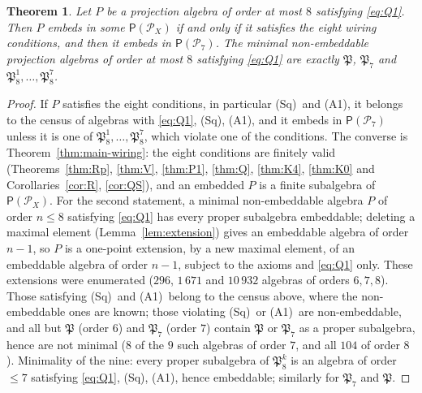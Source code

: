 \documentclass[11pt]{amsart}
\newtheorem{theorem}{Theorem}[section]
\theoremstyle{definition}
\renewcommand{\P}{\mathcal{P}}      %
\newcommand{\PA}{\mathsf{P}}         %
\newcommand{\Wire}{\textup{(Sq)}}      %
\newcommand{\Rcond}{\textup{(A1)}}     %
\begin{document}
\begin{theorem}\label{thm:census}
Let $P$ be a projection algebra of order at most $8$ satisfying \eqref{eq:Q1}. Then $P$ embeds in some $\PA(\P_X)$ if and only if it satisfies the eight wiring conditions, and then it embeds in $\PA(\P_7)$. The minimal non-embeddable projection algebras of order at most $8$ satisfying \eqref{eq:Q1} are exactly $\mathfrak P$, $\mathfrak P_7$ and $\mathfrak P_8^1,\dots,\mathfrak P_8^7$.
\end{theorem}

\begin{proof}
If $P$ satisfies the eight conditions, in particular \Wire\ and \Rcond, it belongs to the census of algebras with \eqref{eq:Q1}, \Wire, \Rcond, and it embeds in $\PA(\P_7)$ unless it is one of $\mathfrak P_8^1,\dots,\mathfrak P_8^7$, which violate one of the conditions. The converse is Theorem~\ref{thm:main-wiring}: the eight conditions are finitely valid (Theorems~\ref{thm:Rp}, \ref{thm:V}, \ref{thm:P1}, \ref{thm:Q}, \ref{thm:K4}, \ref{thm:K0} and Corollaries~\ref{cor:R}, \ref{cor:QS}), and an embedded $P$ is a finite subalgebra of $\PA(\P_X)$. For the second statement, a minimal non-embeddable algebra $P$ of order $n\le8$ satisfying \eqref{eq:Q1} has every proper subalgebra embeddable; deleting a maximal element (Lemma~\ref{lem:extension}) gives an embeddable algebra of order $n-1$, so $P$ is a one-point extension, by a new maximal element, of an embeddable algebra of order $n-1$, subject to the axioms and \eqref{eq:Q1} only. These extensions were enumerated ($296$, $1\,671$ and $10\,932$ algebras of orders $6,7,8$). Those satisfying \Wire\ and \Rcond\ belong to the census above, where the non-embeddable ones are known; those violating \Wire\ or \Rcond\ are non-embeddable, and all but $\mathfrak P$ (order $6$) and $\mathfrak P_7$ (order $7$) contain $\mathfrak P$ or $\mathfrak P_7$ as a proper subalgebra, hence are not minimal ($8$ of the $9$ such algebras of order $7$, and all $104$ of order $8$). Minimality of the nine: every proper subalgebra of $\mathfrak P_8^k$ is an algebra of order $\le7$ satisfying \eqref{eq:Q1}, \Wire, \Rcond, hence embeddable; similarly for $\mathfrak P_7$ and $\mathfrak P$.
\end{proof}
\end{document}
